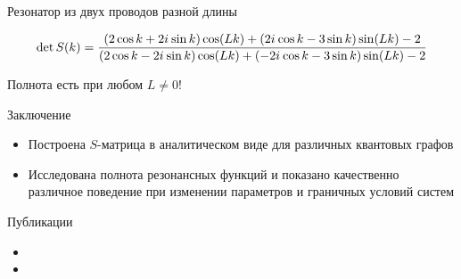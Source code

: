 \documentclass{beamer}
\begin{document}
\begin{frame}{Резонатор из двух проводов разной длины}

\begin{figure}
\begin{tikzpicture}[scale=0.8]

\end{tikzpicture}
\end{figure}


\[
\det S(k) = 
\frac{
(2 \cos k  + 2 \iu \sin k) \cos(L k) + (2 \iu \cos k  - 3 \sin k) \sin(L k) - 2
}
{
(2 \cos k  - 2 \iu \sin k) \cos(L k) + (-2 \iu \cos k  - 3 \sin k) \sin(L k) - 2
}
\]

Полнота есть при любом $L \ne 0$!

\end{frame}


\begin{frame}{Заключение}
\begin{itemize}
\item Построена $S$-матрица в аналитическом виде для различных квантовых графов
\item Исследована полнота резонансных функций и показано качественно различное поведение при изменении параметров и граничных условий систем
\end{itemize}
\end{frame}


\begin{frame}{Публикации}
\begin{itemize}
\item {}
\item {}
\end{itemize}
\end{frame}
\end{document}
